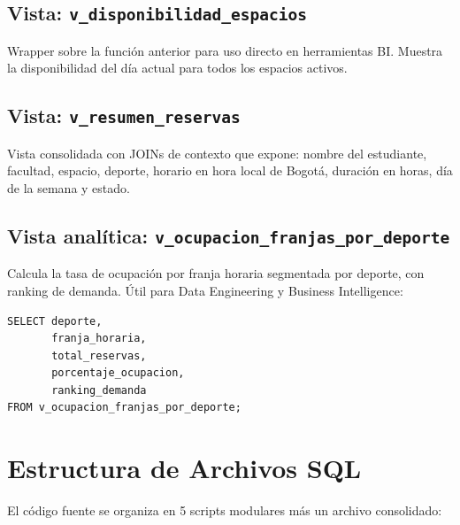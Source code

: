 \documentclass[12pt, a4paper]{article}
\begin{document}
\subsection{Vista: \texttt{v\_disponibilidad\_espacios}}

Wrapper sobre la función anterior para uso directo en herramientas BI. Muestra la disponibilidad del día actual para todos los espacios activos.

\subsection{Vista: \texttt{v\_resumen\_reservas}}

Vista consolidada con JOINs de contexto que expone: nombre del estudiante, facultad, espacio, deporte, horario en hora local de Bogotá, duración en horas, día de la semana y estado.

\subsection{Vista analítica: \texttt{v\_ocupacion\_franjas\_por\_deporte}}

Calcula la tasa de ocupación por franja horaria segmentada por deporte, con ranking de demanda. Útil para Data Engineering y Business Intelligence:

\begin{lstlisting}[caption={Consulta de ocupación por franjas y deporte.}]
SELECT deporte,
       franja_horaria,
       total_reservas,
       porcentaje_ocupacion,
       ranking_demanda
FROM v_ocupacion_franjas_por_deporte;
\end{lstlisting}


\section{Estructura de Archivos SQL}

El código fuente se organiza en 5 scripts modulares más un archivo consolidado:
\end{document}
